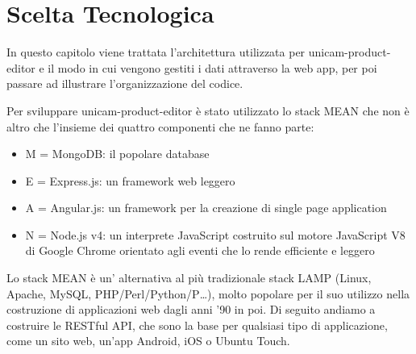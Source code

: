 \chapter{Scelta Tecnologica}
\label{chap:scelta}
In questo capitolo viene trattata l'architettura utilizzata per unicam-product-editor e il modo in cui vengono gestiti i dati attraverso la web app, per poi passare ad illustrare l'organizzazione del codice.

Per sviluppare unicam-product-editor è stato utilizzato lo stack MEAN che non è altro che l'insieme dei quattro componenti che ne fanno parte:
\begin{itemize}
	\item M = MongoDB: il popolare database
	\item E = Express.js: un framework web leggero
	\item A = Angular.js: un framework per la creazione di single page application
	\item N = Node.js v4: un interprete JavaScript costruito sul motore JavaScript V8 di Google Chrome orientato agli eventi che lo rende efficiente e leggero
\end{itemize}
Lo stack MEAN è un' alternativa al più tradizionale stack LAMP (Linux, Apache, MySQL, PHP/Perl/Python/P…), molto popolare per il suo utilizzo nella costruzione di applicazioni web dagli anni '90 in poi.
Di seguito andiamo a costruire le RESTful API\cite{restful_api}, che sono la base per qualsiasi tipo di applicazione, come un sito web, un'app Android, iOS o Ubuntu Touch.

